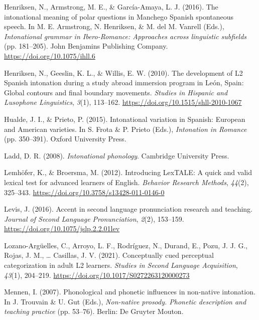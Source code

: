 \documentclass[]{article}
\newlength{\cslhangindent}
\newenvironment{CSLReferences}[2] %
 {%
  \setlength{\parindent}{0pt}
  \ifodd #1 \everypar{\setlength{\hangindent}{\cslhangindent}}\ignorespaces\fi
  \ifnum #2 > 0
  \setlength{\parskip}{#2\baselineskip}
  \fi
 }%
 {}
\begin{document}
\begin{CSLReferences}{1}{0}
\leavevmode{}%
Henriksen, N., Armstrong, M. E., \& García-Amaya, L. J. (2016). The intonational meaning of polar questions in {M}anchego {S}panish spontaneous speech. In M. E. Armstrong, N. Henriksen, \& M. del M. Vanrell (Eds.), \emph{Intonational grammar in {I}bero-{R}omance: {A}pproaches across linguistic subfields} (pp. 181--205). John Benjamins Publishing Company. \url{https://doi.org/10.1075/ihll.6}

\leavevmode{}%
Henriksen, N., Geeslin, K. L., \& Willis, E. W. (2010). The development of {L}2 {S}panish intonation during a study abroad immersion program in {L}e{ó}n, {S}pain: {G}lobal contours and final boundary movements. \emph{Studies in Hispanic and Lusophone Linguistics}, \emph{3}(1), 113--162. \url{https://doi.org/10.1515/shll-2010-1067}

\leavevmode{}%
Hualde, J. I., \& Prieto, P. (2015). Intonational variation in {S}panish: {E}uropean and {A}merican varieties. In S. Frota \& P. Prieto (Eds.), \emph{Intonation in {R}omance} (pp. 350--391). Oxford University Press.

\leavevmode{}%
Ladd, D. R. (2008). \emph{Intonational phonology}. Cambridge University Press.

\leavevmode{}%
Lemhöfer, K., \& Broersma, M. (2012). Introducing LexTALE: A quick and valid lexical test for advanced learners of {E}nglish. \emph{Behavior Research Methods}, \emph{44}(2), 325--343. \url{https://doi.org/10.3758/s13428-011-0146-0}

\leavevmode{}%
Levis, J. (2016). Accent in second language pronunciation research and teaching. \emph{Journal of Second Language Pronunciation}, \emph{2}(2), 153--159. \url{https://doi.org/10.1075/jslp.2.2.01lev}

\leavevmode{}%
Lozano-Argüelles, C., Arroyo, L. F., Rodríguez, N., Durand, E., Pozu, J. J. G., Rojas, J. M., \ldots{} Casillas, J. V. (2021). Conceptually cued perceptual categorization in adult {L}2 learners. \emph{Studies in Second Language Acquisition}, \emph{43}(1), 204--219. \url{https://doi.org/10.1017/S0272263120000273}

\leavevmode{}%
Mennen, I. (2007). Phonological and phonetic influences in non-native intonation. In J. Trouvain \& U. Gut (Eds.), \emph{Non-native prosody. Phonetic description and teaching practice} (pp. 53--76). Berlin: De Gruyter Mouton.


\end{CSLReferences}
\end{document}
